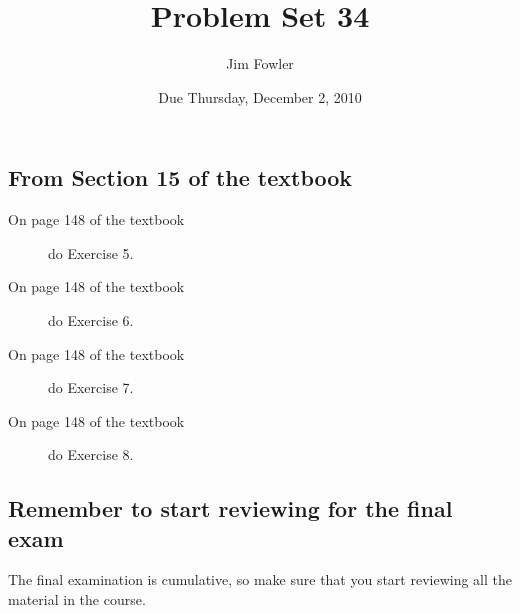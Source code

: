 \documentclass[12pt]{handout}
\author{Jim Fowler}
\title{Problem Set 34}
\date{Due Thursday, December  2, 2010}
\begin{document}
\maketitle










\subsection*{From Section 15 of the textbook}



\begin{description}

\item[On page 148 of the textbook] do Exercise 5.

\item[On page 148 of the textbook] do Exercise 6.

\item[On page 148 of the textbook] do Exercise 7.

\item[On page 148 of the textbook] do Exercise 8.

\end{description}













\subsection*{Remember to start reviewing for the final exam}
The final examination is cumulative, so make sure that you start reviewing all the material in the course.
\end{document}
